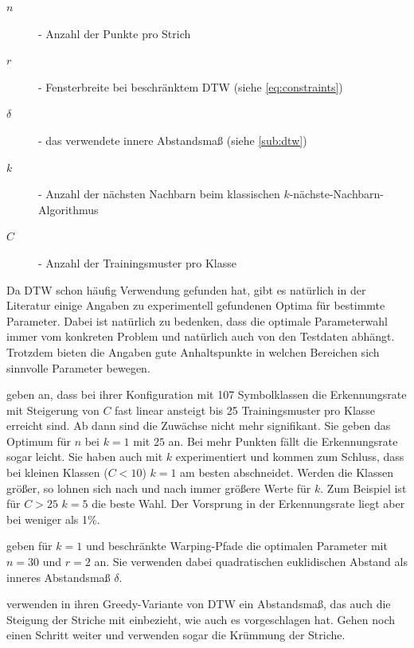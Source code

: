 \begin{description}
  \item[$n$] - Anzahl der Punkte pro Strich
  \item[$r$] - Fensterbreite bei beschränktem DTW (siehe \ref{eq:constraints})
  \item[$\delta$] - das verwendete innere Abstandsmaß (siehe \ref{sub:dtw})
  \item[$k$] - Anzahl der nächsten Nachbarn beim klassischen $k$-nächste-Nachbarn-Algorithmus
  \item[$C$] - Anzahl der Trainingsmuster pro Klasse
\end{description}

Da DTW schon häufig Verwendung gefunden hat, gibt es natürlich in der Literatur einige Angaben zu experimentell gefundenen Optima für bestimmte Parameter. Dabei ist natürlich zu bedenken, dass die optimale Parameterwahl immer vom konkreten Problem und natürlich auch von den Testdaten abhängt. Trotzdem bieten die Angaben gute Anhaltspunkte in welchen Bereichen sich sinnvolle Parameter bewegen.

\citet{Golubitsky:2009p1842} geben an, dass bei ihrer Konfiguration mit 107 Symbolklassen die Erkennungsrate mit Steigerung von $C$ fast linear ansteigt bis 25 Trainingsmuster pro Klasse erreicht sind. Ab dann sind die Zuwächse nicht mehr signifikant. Sie geben das Optimum für $n$ bei $k = 1$ mit $25$ an. Bei mehr Punkten fällt die Erkennungsrate sogar leicht. Sie haben auch mit $k$ experimentiert und kommen zum Schluss, dass bei kleinen Klassen ($C<10$) $k = 1$ am besten abschneidet. Werden die Klassen größer, so lohnen sich nach und nach immer größere Werte für $k$. Zum Beispiel ist für $C>25$  $k=5$ die beste Wahl. Der Vorsprung in der Erkennungsrate liegt aber bei weniger als 1\%.

\citet{Golubitsky:2009p2433} geben für $k=1$ und beschränkte Warping-Pfade die optimalen Parameter mit $n = 30$ und $r = 2$ an. Sie verwenden dabei quadratischen euklidischen Abstand als inneres Abstandsmaß $\delta$.

\citet{MacLean:2010p9970} verwenden in ihren Greedy-Variante von DTW ein Abstandsmaß, das auch die Steigung der Striche mit einbezieht, wie auch \citet{Tappert:1982p10305} es vorgeschlagen hat.
\citet{Vuong:2010p10279} Gehen noch einen Schritt weiter und verwenden sogar die Krümmung der Striche.
